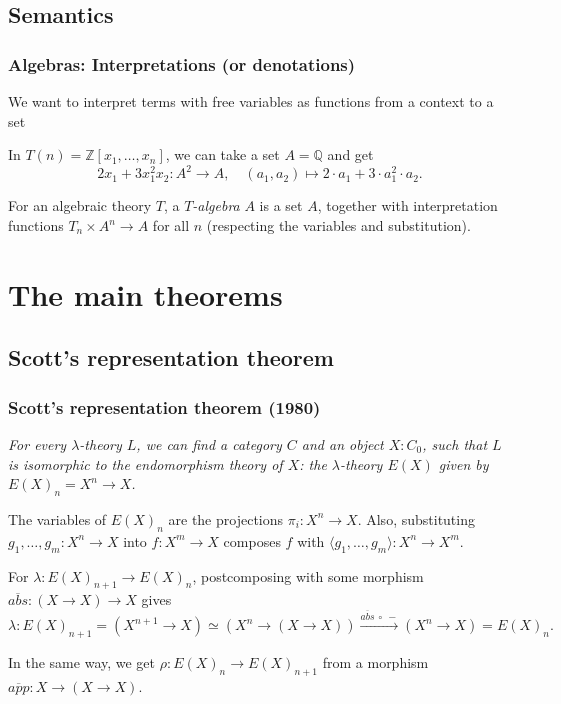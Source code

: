 \documentclass[aspectratio=169]{fancyslides} %
\begin{document}
  \subsection{Semantics}
  \begin{frame}
    \frametitle{Algebras: Interpretations (or denotations)}
    We want to interpret terms with free variables as functions from a context to a set

    \begin{example}
      In $ T(n) = \mathbb Z[x_1, \dots, x_n] $, we can take a set $ A = \mathbb Q $ and get
      \[ 2 x_1 + 3 x_1^2 x_2: A^2 \to A, \quad (a_1, a_2) \mapsto 2 \cdot a_1 + 3 \cdot a_1^2 \cdot a_2. \]
    \end{example}

    \pause

    \begin{definition}
      For an algebraic theory $ T $, a \textit{$ T $-algebra} $ A $ is a set $ A $, together with interpretation functions $ T_n \times A^n \to A $ for all $ n $ (respecting the variables and substitution).
    \end{definition}
  \end{frame}

  \section{The main theorems}

  \frame{\tableofcontents[currentsection]}

  \subsection{Scott's representation theorem}
  \begin{frame}
    \frametitle{Scott's representation theorem (1980)}

    \textit{For every $ \lambda $-theory $ L $, we can find a category $ C $ and an object $ X : C_0 $, such that $ L $ is isomorphic to the \textit{endomorphism theory} of $ X $: the $ \lambda $-theory $ E(X) $ given by $ E(X)_n = X^n \to X $.}

    \pause

    The variables of $ E(X)_n $ are the projections $ \pi_i: X^n \to X $. Also, substituting $ g_1, \dots, g_m : X^n \to X $ into $ f: X^m \to X $ composes $ f $ with $ \langle g_1, \dots, g_m \rangle : X^n \to X^m $.

    \pause

    For $ \lambda: E(X)_{n + 1} \to E(X)_n $, postcomposing with some morphism $ \overline{abs}: (X \to X) \to X $ gives
    \[ \lambda: E(X)_{n + 1} = (X^{n + 1} \to X) \simeq (X^n \to (X \to X)) \xrightarrow{\overline{abs}\ \circ\ -} (X^n \to X) = E(X)_n. \]

    In the same way, we get $ \rho: E(X)_n \to E(X)_{n + 1} $ from a morphism $ \overline{app}: X \to (X \to X) $.
  \end{frame}
\end{document}
